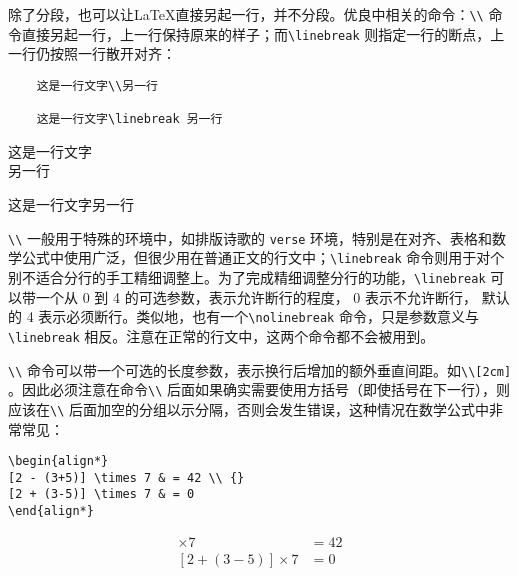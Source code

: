 除了分段，也可以让\LaTeX 直接另起一行，并不分段。优良中相关的命令：\verb|\\| 命令直接另起一行，上一行保持原来的样子；而\verb|\linebreak| 则指定一行的断点，上一行仍按照一行散开对齐：

\begin{minipage}[t]{0.45\textwidth}
\begin{lstlisting}
    这是一行文字\\另一行

    这是一行文字\linebreak 另一行
\end{lstlisting}
\end{minipage}
\hfill
\begin{minipage}[t]{0.45\textwidth}
    这是一行文字 \\ 另一行

    这是一行文字\linebreak 另一行
\end{minipage}

\verb|\\| 一般用于特殊的环境中，如排版诗歌的 \verb|verse| 环境，特别是在对齐、表格和数学公式中使用广泛，但很少用在普通正文的行文中；\verb|\linebreak| 命令则用于对个别不适合分行的手工精细调整上。为了完成精细调整分行的功能，\verb|\linebreak| 可以带一个从 0 到 4 的可选参数，表示允许断行的程度， 0 表示不允许断行， 默认的 4 表示必须断行。类似地，也有一个\verb|\nolinebreak| 命令，只是参数意义与\verb|\linebreak| 相反。注意在正常的行文中，这两个命令都不会被用到。

\verb|\\| 命令可以带一个可选的长度参数，表示换行后增加的额外垂直间距。如\verb|\\[2cm]| 。因此必须注意在命令\verb|\\| 后面如果确实需要使用方括号（即使括号在下一行），则应该在\verb|\\| 后面加空的分组以示分隔，否则会发生错误，这种情况在数学公式中非常常见：

\begin{minipage}[t]{0.45\textwidth}
\begin{lstlisting}
\begin{align*}
[2 - (3+5)] \times 7 & = 42 \\ {}
[2 + (3-5)] \times 7 & = 0
\end{align*}
\end{lstlisting}
\end{minipage}
\hfill
\begin{minipage}[t]{0.45\textwidth}
\begin{align*}
[2 - (3+5)] \times 7 & = 42 \\ {}
[2 + (3-5)] \times 7 & = 0
\end{align*}    
\end{minipage}

